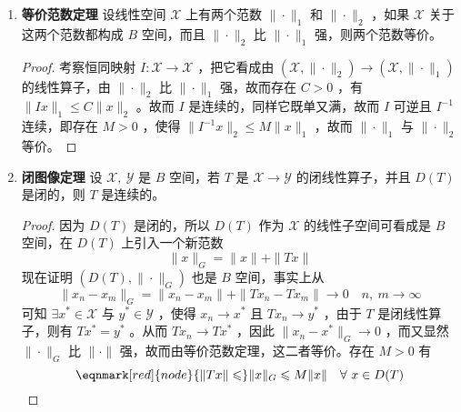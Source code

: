\begin{enumerate}[leftmargin=2cm, label=\arabic*]
\begin{proof}
    任取 $x\in\overline{D(T)}$ ，$\exists\ x_n\in D(T)$ ，$\lim\limits_{n\to\infty} x_n = x$ ，依据假设 $T$ 在 $D(T)$ 上连续，从而有界，即存在 $M>0$ ，使得 $\|Tx\| \leqslant M \|x\|$ ，于是 $\|Tx_{n+p} - Tx_n\| \leqslant M\|x_{n+p} - x_n\|$ ，故而 $\{Tx_n\}$ 为 $\mathscr{Y}$ 中的基本列，由于 $\mathscr{Y}$ 为 $B$ 空间，故而完备，则 $\{Tx_n\}$ 可以收敛，故而 $\exists\ y\in \mathscr{Y}$ ，使得 $Tx_n\to y$ 。而 $y$ 仅依赖于 $x$ ，与 $x_n$ 的选择无关。故而可以定义 $T_1:\ x\to y$ ，且 $T_1$ 是线性的，且 $T_1\big|_{D(T)} = T$ ，并且 $\|T_1x\| \leqslant M\|x\|$ 。 
\end{proof}
    \item \textbf{等价范数定理} 设线性空间 $\mathscr{X}$ 上有两个范数 $\|\cdot\|_1$ 和 $\|\cdot\|_2$ ，如果 $\mathscr{X}$ 关于这两个范数都构成 $B$ 空间，而且 $\|\cdot\|_2$ 比 $\|\cdot\|_1$ 强，则两个范数等价。
\begin{proof}
    考察恒同映射 $I:\mathscr{X}\to\mathscr{X}$ ，把它看成由 $(\mathscr{X}, \|\cdot\|_2)\to(\mathscr{X},\|\cdot\|_1)$ 的线性算子，由 $\|\cdot\|_2$ 比 $\|\cdot\|_1$ 强，故而存在 $C>0$ ，有 $\|Ix\|_1\leqslant C\|x\|_2$ 。故而 $I$ 是连续的，同样它既单又满，故而 $I$ 可逆且 $I^{-1}$ 连续，即存在 $M>0$ ，使得 $\|I^{-1}x\|_2 \leqslant M\|x\|_1$ ，故而 $\|\cdot\|_1$ 与 $\|\cdot\|_2$ 等价。
\end{proof}
    \item \textbf{闭图像定理} 设 $\mathscr{X},\ \mathscr{Y}$ 是 $B$ 空间，若 $T$ 是 $\mathscr{X}\to\mathscr{Y}$ 的闭线性算子，并且 $D(T)$ 是闭的，则 $T$ 是连续的。
\begin{proof}
    因为 $D(T)$ 是闭的，所以 $D(T)$ 作为 $\mathscr{X}$ 的线性子空间可看成是 $B$ 空间，在 $D(T)$ 上引入一个新范数
\begin{equation*}
    \|x\|_G = \|x\| + \|Tx\|
\end{equation*}
现在证明 $(D(T),\|\cdot\|_G)$ 也是 $B$ 空间，事实上从 
\begin{equation*}
    \|x_n - x_m\|_G = \|x_n - x_m\| + \|Tx_n - Tx_m\| \to 0 \quad n,\ m\to \infty
\end{equation*}
可知 $\exists x^*\in\mathscr{X}$ 与 $y^*\in\mathscr{Y}$ ，使得 $x_n\to x^*$ 且 $Tx_n\to y^*$ ，由于 $T$ 是闭线性算子，则有 $Tx^* = y^*$ 。从而 $Tx_n \to Tx^*$ ，因此 $\|x_n - x^*\|_G \to 0$ ，而又显然 $\|\cdot\|_G$ 比 $\|\cdot\|$ 强，故而由等价范数定理，这二者等价。存在 $M>0$ 有
\begin{equation*}
    \eqnmark[red]{node}{\|Tx\| \leqslant} \|x\|_G \leqslant M\|x\| \quad \forall\ x\in D(T)
\end{equation*}


\end{proof}
\end{enumerate}
